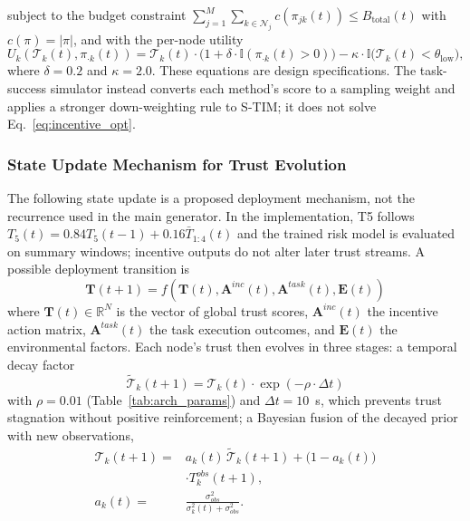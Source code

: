 \documentclass[notspecified,article,submit,moreauthors]{Definitions/mdpi}
\begin{document}
subject to the budget constraint $\sum_{j=1}^{M} \sum_{k \in \mathcal{N}_j} c(\pi_{jk}(t)) \leq B_{\text{total}}(t)$ with $c(\pi) = |\pi|$, and with the per-node utility
\begin{equation}\label{eq:utility}
U_k\!\left( \mathcal{T}_k(t), \pi_{\cdot k}(t) \right) = \mathcal{T}_k(t) \cdot \bigl(1 + \delta \cdot \mathbb{I}(\pi_{\cdot k}(t) > 0)\bigr) - \kappa \cdot \mathbb{I}\bigl(\mathcal{T}_k(t) < \theta_{\text{low}}\bigr),
\end{equation}
where $\delta = 0.2$ and $\kappa = 2.0$. These equations are design specifications. The task-success simulator instead converts each method's score to a sampling weight and applies a stronger down-weighting rule to S-TIM; it does not solve Eq.~\ref{eq:incentive_opt}.

\subsubsection{State Update Mechanism for Trust Evolution}
\label{sec:state_update}
The following state update is a proposed deployment mechanism, not the recurrence used in the main generator. In the implementation, T5 follows $T_5(t)=0.84T_5(t-1)+0.16\bar{T}_{1:4}(t)$ and the trained risk model is evaluated on summary windows; incentive outputs do not alter later trust streams. A possible deployment transition is
\begin{equation}
\mathbf{T}(t+1) = f\left( \mathbf{T}(t), \mathbf{A}^{inc}(t), \mathbf{A}^{task}(t), \mathbf{E}(t) \right)
\end{equation}
where $\mathbf{T}(t) \in \mathbb{R}^N$ is the vector of global trust scores, $\mathbf{A}^{inc}(t)$ the incentive action matrix, $\mathbf{A}^{task}(t)$ the task execution outcomes, and $\mathbf{E}(t)$ the environmental factors. Each node's trust then evolves in three stages: a temporal decay factor
\begin{equation}\label{eq:decay}
\tilde{\mathcal{T}}_k(t+1) = \mathcal{T}_k(t) \cdot \exp\left(-\rho \cdot \Delta t\right)
\end{equation}
with $\rho = 0.01$ (Table~\ref{tab:arch_params}) and $\Delta t = 10$~s, which prevents trust stagnation without positive reinforcement; a Bayesian fusion of the decayed prior with new observations,
\begin{equation}\label{eq:bayes_update}
\begin{aligned}
  \mathcal{T}_k(t+1) ={}& a_k(t)\,\tilde{\mathcal{T}}_k(t+1)
  + \bigl(1-a_k(t)\bigr)\\
  &\cdot T_k^{obs}(t+1),\\
  a_k(t) ={}& \frac{\sigma_{obs}^2}{\sigma_k^2(t)+\sigma_{obs}^2}.
\end{aligned}
\end{equation}
\end{document}
